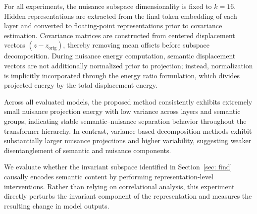 For all experiments, the nuisance subspace dimensionality is fixed to \(k=16\). Hidden representations are extracted from the final token embedding of each layer and converted to floating-point representations prior to covariance estimation. Covariance matrices are constructed from centered displacement vectors \((z-z_{\text{orig}})\), thereby removing mean offsets before subspace decomposition. During nuisance energy computation, semantic displacement vectors are not additionally normalized prior to projection; instead, normalization is implicitly incorporated through the energy ratio formulation, which divides projected energy by the total displacement energy.

Across all evaluated models, the proposed method consistently exhibits extremely small nuisance projection energy with low variance across layers and semantic groups, indicating stable semantic--nuisance separation behavior throughout the transformer hierarchy. In contrast, variance-based decomposition methods exhibit substantially larger nuisance projections and higher variability, suggesting weaker disentanglement of semantic and nuisance components.




We evaluate whether the invariant subspace identified in Section~\ref{sec: find} causally encodes semantic content by performing representation-level interventions. Rather than relying on correlational analysis, this experiment directly perturbs the invariant component of the representation and measures the resulting change in model outputs.

